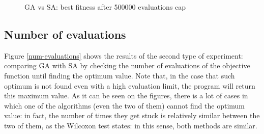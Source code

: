 \documentclass{article}[12pt]
\begin{document}
	\begin{figure}
		\newline
		\caption{GA vs SA: best fitness after 500000 evaluations cap}
		\label{best-fitness}
	\end{figure}
	
	\subsection{Number of evaluations}
	
	Figure \ref{num-evaluations} shows the results of the second type of experiment: comparing GA with SA by checking the number of evaluations of the objective function until finding the optimum value. Note that, in the case that such optimum is not found even with a high evaluation limit, the program will return this maximum value.
	\bigbreak
	As it can be seen on the figures, there is a lot of cases in which one of the algorithms (even the two of them) cannot find the optimum value: in fact, the number of times they get stuck is relatively similar between the two of them, as the Wilcoxon test states: in this sense, both methods are similar.
		
\end{document}
